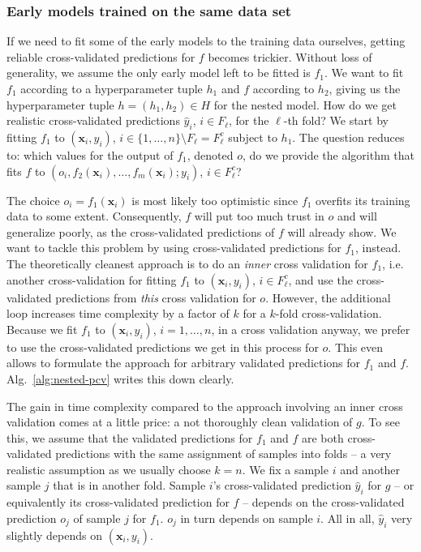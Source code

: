 \subsubsection{Early models trained on the same data set}
If we need to fit some of the early models to the training data ourselves, getting reliable 
cross-validated predictions
for $f$ becomes trickier. Without loss of generality, we assume the only early model left to be 
fitted 
is $f_1$. We want to fit $f_1$ according to a hyperparameter tuple $h_1$ and $f$ according to $h_2$, 
giving us the hyperparameter tuple $h = (h_1, h_2) \in H$ for the nested model. How do 
we get realistic cross-validated predictions $\hat{y}_i$, $i \in F_\ell$, for the $\ell$-th fold? 
We start by fitting $f_1$ to $(\mathbf{x}_i, y_i)$, $i \in \{ 1, \ldots, n \} \setminus F_\ell = F_\ell^c$ 
subject to $h_1$.
The question reduces to: which values for the output of $f_1$, denoted $o$, do we provide the 
algorithm that fits $f$ to $(o_i, f_2(\mathbf{x}_i), \dots, f_m(\mathbf{x}_i); y_i)$, $i \in 
F_\ell^c$?

The choice $o_i = f_1(\mathbf{x}_i)$ is most likely too optimistic since $f_1$ overfits its training 
data to some extent. Consequently, $f$ will put too much trust in $o$ and will generalize poorly, 
as the cross-validated predictions of $f$ will already show. We want to tackle this problem by 
using cross-validated predictions for $f_1$, instead. The theoretically cleanest approach 
is to do an \textit{inner} cross validation for $f_1$, i.e. another cross-validation for fitting 
$f_1$ to $(\mathbf{x}_i, y_i)$, $i \in F_\ell^c$, and use the cross-validated predictions from \textit{this} 
cross validation for $o$. However, the additional loop increases time complexity by a factor of $k$ 
for a $k$-fold cross-validation. Because we fit $f_1$ to $(\mathbf{x}_i, y_i)$, $i = 1, \ldots, n$, 
in a cross validation anyway, we prefer to use the cross-validated predictions we get in this 
process for $o$. This even allows to formulate the approach for arbitrary validated predictions 
for $f_1$ and $f$. Alg.\ \ref{alg:nested-pcv} writes this down clearly.



The gain in time complexity compared to the approach involving an inner cross validation comes at a 
little price: a not thoroughly clean validation of $g$. To see this, we assume that the validated 
predictions for $f_1$ and $f$ are both cross-validated predictions with the same
assignment of samples into folds -- a very 
realistic assumption as we 
usually choose $k = n$. We fix a sample $i$ and another sample $j$ that is in another fold. 
Sample $i$'s cross-validated prediction $\hat{y}_i$ for $g$ -- or equivalently its cross-validated 
prediction for $f$ -- depends on the cross-validated 
prediction $o_j$ of sample $j$ for $f_1$. $o_j$ in turn depends on sample 
$i$. All in all, $\hat{y}_i$ very slightly depends on $(\mathbf{x}_i, y_i)$.


